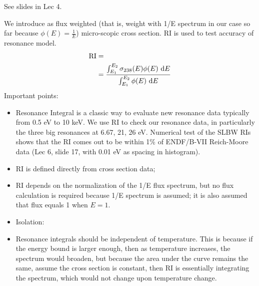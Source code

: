 \documentclass{school-22.211-notes}
\date{February 22, 2012}
\begin{document}
\maketitle

See slides in Lec 4. 

We introduce  as flux weighted (that is, weight with 1/E spectrum in our case so far because $\phi(E) = \frac{1}{E}$) micro-scopic cross section. RI is used to test accuracy of resonance model. 
\begin{align}
\mathrm{RI} &= \\
&=  \frac{\int_{E_1}^{E_2} \sigma_{238} (E) \phi(E) \mbox{ }\mathrm{d} E}{\int_{E_1}^{E_2} \phi (E) \mbox{ }\mathrm{d} E }  \\
\end{align}
Important points:
\begin{itemize}
\item Resonance Integral is a classic way to evaluate new resonance data typically from 0.5 eV to 10 keV. We use RI to check our resonance data, in particularly the three big resonances at 6.67, 21, 26 eV. Numerical test of the SLBW RIs shows that the RI comes out to be within 1\% of ENDF/B-VII Reich-Moore data (Lec 6, slide 17, with 0.01 eV as spacing in histogram). 
\item RI is defined directly from cross section data;
\item RI depends on the normalization of the 1/E flux spectrum, but no flux calculation is required because 1/E spectrum is assumed; it is also assumed that flux equals 1 when $E = 1$.  
\item Isolation: 
\item Resonance integrals should be independent of temperature. This is because if the energy bound is larger enough, then as temperature increases, the spectrum would broaden, but because the area under the curve remains the same, assume the cross section is constant, then RI is essentially integrating the spectrum, which would not change upon temperature change. 
\end{itemize}
\end{document}
